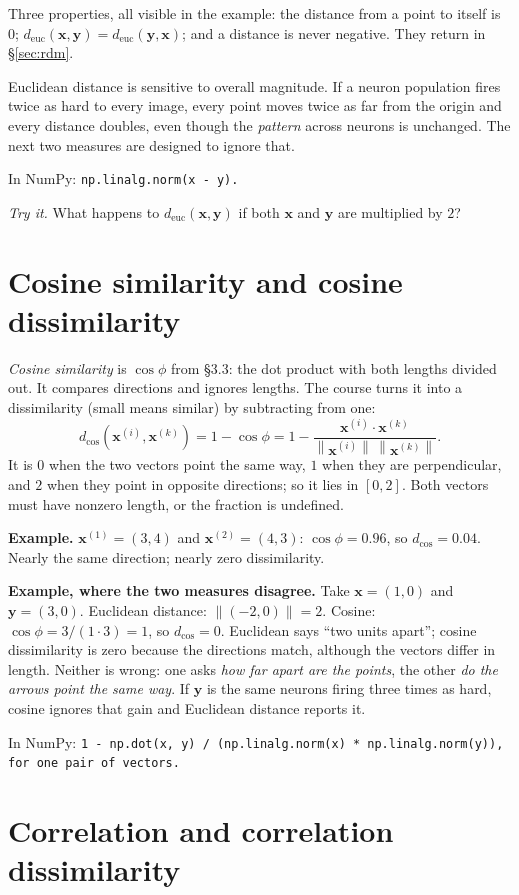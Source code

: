\documentclass[11pt]{article}
\newcommand{\vx}{\bm{x}}
\newcommand{\vy}{\bm{y}}
\newcommand{\norm}[1]{\left\lVert #1 \right\rVert}
\newcommand{\deuc}{d_{\mathrm{euc}}}
\newcommand{\dcos}{d_{\cos}}
\newcommand{\np}[1]{{\small\color{lightgray}In NumPy: \texttt{#1}}\par}
\begin{document}
Three properties, all visible in the example: the distance from a point to itself is
$0$; $\deuc(\vx, \vy) = \deuc(\vy, \vx)$; and a distance is never negative. They return
in \S\ref{sec:rdm}.

Euclidean distance is sensitive to overall magnitude. If a neuron population fires twice
as hard to every image, every point moves twice as far from the origin and every distance
doubles, even though the \emph{pattern} across neurons is unchanged. The next two
measures are designed to ignore that.

\np{np.linalg.norm(x - y).}

\textit{Try it.} What happens to $\deuc(\vx, \vy)$ if both $\vx$ and $\vy$ are multiplied by $2$?

\section{Cosine similarity and cosine dissimilarity}

\emph{Cosine similarity} is $\cos\phi$ from \S3.3: the dot product with both lengths
divided out. It compares directions and ignores lengths. The course turns it
into a dissimilarity (small means similar) by subtracting from one:
\[
\dcos(\vx^{(i)}, \vx^{(k)}) = 1 - \cos\phi
= 1 - \frac{\vx^{(i)} \cdot \vx^{(k)}}{\norm{\vx^{(i)}}\,\norm{\vx^{(k)}}} .
\]
It is $0$ when the two vectors point the same way, $1$ when they are perpendicular, and
$2$ when they point in opposite directions; so it lies in $[0, 2]$. Both vectors must have
nonzero length, or the fraction is undefined.

\textbf{Example.} $\vx^{(1)} = (3, 4)$ and $\vx^{(2)} = (4, 3)$: $\cos\phi = 0.96$, so
$\dcos = 0.04$. Nearly the same direction; nearly zero dissimilarity.

\textbf{Example, where the two measures disagree.} Take $\vx = (1, 0)$ and $\vy = (3, 0)$.
Euclidean distance: $\norm{(-2, 0)} = 2$. Cosine: $\cos\phi = 3 / (1 \cdot 3) = 1$, so
$\dcos = 0$. Euclidean says ``two units apart''; cosine dissimilarity is zero because the
directions match, although the vectors differ in length. Neither is wrong: one asks
\emph{how far apart are the points}, the other \emph{do the arrows point the same way}.
If $\vy$ is the same neurons firing three times as hard, cosine ignores that gain and
Euclidean distance reports it.

\np{1 - np.dot(x, y) / (np.linalg.norm(x) * np.linalg.norm(y)), for one pair of vectors.}

\section{Correlation and correlation dissimilarity}
\end{document}
